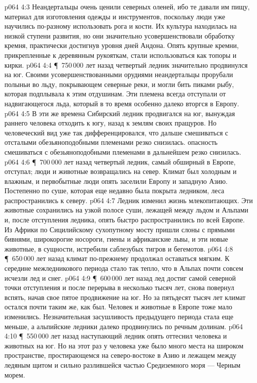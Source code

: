 \vs p064 4:3 Неандертальцы очень ценили северных оленей, ибо те давали им пищу, материал для изготовления одежды и инструментов, поскольку люди уже научились по\hyp{}разному использовать рога и кости. Их культура находилась на низкой ступени развития, но они значительно усовершенствовали обработку кремня, практически достигнув уровня дней Андона. Опять крупные кремни, прикрепленные к деревянным рукояткам, стали использоваться как топоры и кирки.
\vs p064 4:4 \P\ 750\,000 лет назад четвертый ледник значительно продвинулся на юг. Своими усовершенствованными орудиями неандертальцы прорубали полыньи во льду, покрывающем северные реки, и могли бить пиками рыбу, которая подплывала к этим отдушинам. Эти племена всегда отступали от надвигающегося льда, который в то время особенно далеко вторгся в Европу.
\vs p064 4:5 В эти же времена Сибирский ледник продвигался на юг, вынуждая раннего человека отходить к югу, назад к землям своих пращуров. Но человеческий вид уже так дифференцировался, что дальше смешиваться с отсталыми обезьяноподобными племенами резко снизилась. опасность смешиваться с обезьяноподобными племенами в дальнейшем резко снизилась.
\vs p064 4:6 \P\ 700\,000 лет назад четвертый ледник, самый обширный в Европе, отступал; люди и животные возвращались на север. Климат был холодным и влажным, и первобытные люди опять заселили Европу и западную Азию. Постепенно по суше, которая еще недавно была покрыта ледником, леса распространились к северу.
\vs p064 4:7 Ледник изменил жизнь млекопитающих. Эти животные сохранились на узкой полосе суши, лежащей между льдом и Альпами и, после отступления ледника, опять быстро распространились по всей Европе. Из Африки по Сицилийскому сухопутному мосту пришли слоны с прямыми бивнями, широкорогие носороги, гиены и африканские львы, и эти новые животные, в сущности, истребили саблезубых тигров и бегемотов.
\vs p064 4:8 \P\ 650\,000 лет назад климат по\hyp{}прежнему продолжал оставаться мягким. К середине межледникового периода стало так тепло, что в Альпах почти совсем исчезли лед и снег.
\vs p064 4:9 \P\ 600\,000 лет назад лед достиг самой северной точки отступления и после перерыва в несколько тысяч лет, снова повернул вспять, начав свое пятое продвижение на юг. Но за пятьдесят тысяч лет климат остался почти таким же, как был. Человек и животные в Европе тоже мало изменились. Незначительная засушливость предыдущего периода стала еще меньше, а альпийские ледники далеко продвинулись по речным долинам.
\vs p064 4:10 \P\ 550\,000 лет назад наступающий ледник опять оттеснил человека и животных на юг. Но на этот раз у человека уже было много места на широком пространстве, простирающемся на северо\hyp{}востоке в Азию и лежащем между ледяным щитом и сильно разлившейся частью Средиземного моря --- Черным морем.
